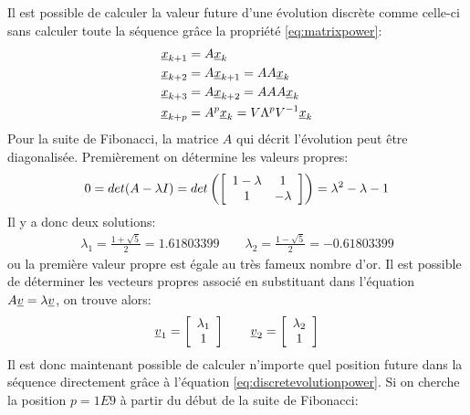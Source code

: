 \begin{example}
Il est possible de calculer la valeur future d'une évolution discrète comme celle-ci sans calculer toute la séquence grâce la propriété \eqref{eq:matrixpower}:
\begin{align}
\underline{x}_{k+1} &= A \underline{x}_{k} \\
\underline{x}_{k+2} &= A \underline{x}_{k+1} = A A \underline{x}_{k} \\
\underline{x}_{k+3} &= A \underline{x}_{k+2} = A A A \underline{x}_{k} \\
\underline{x}_{k+p} &= A^p \underline{x}_{k} = V \Lambda^p V^{-1} \underline{x}_{k}
\label{eq:discretevolutionpower}
\end{align}
Pour la suite de Fibonacci, la matrice $A$ qui décrit l'évolution peut être diagonalisée. Premièrement on détermine les valeurs propres:
\begin{align}
0
=
det(A - \lambda I) 
=
det\left(
\left[ \begin{array}{c c}  
1-\lambda & 1 \\ 1 & -\lambda  
\end{array} \right]
\right)
= 
\lambda^2 - \lambda -1 
\end{align}
Il y a donc deux solutions:
\begin{align}
\lambda_1 = \frac{1 + \sqrt{5}}{2} = 1.61803399 \quad\quad \lambda_2 = \frac{1 - \sqrt{5}}{2} = -0.61803399
\end{align}
ou la première valeur propre est égale au très fameux nombre d'or. Il est possible de déterminer les vecteurs propres associé en substituant dans l'équation $A \underline{v} = \lambda \underline{v}$, on trouve alors:
\begin{align}
\underline{v}_1 = 
\left[ \begin{array}{c}  
\lambda_1 \\ 1
\end{array} \right]
\quad\quad 
\underline{v}_2 = 
\left[ \begin{array}{c}  
\lambda_2 \\ 1 
\end{array} \right]
\end{align}
Il est donc maintenant possible de calculer n'importe quel position future dans la séquence directement grâce à l'équation \eqref{eq:discretevolutionpower}. Si on cherche la position $p=1E9$ à partir du début de la suite de Fibonacci:
\begin{align}

\end{align}
\end{example}
